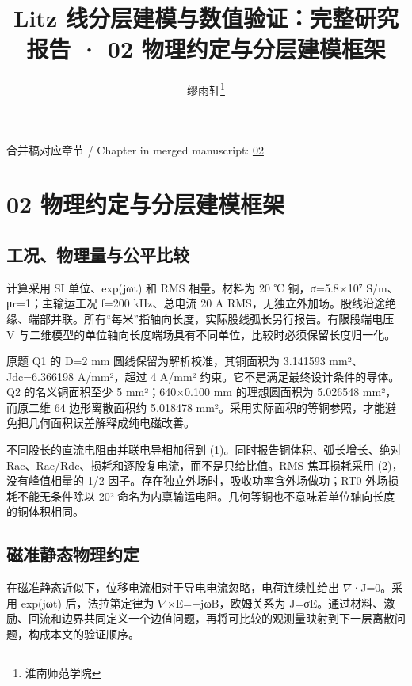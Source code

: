 \documentclass[journal,10pt]{IEEEtran}
\begin{document}
\title{Litz 线分层建模与数值验证：完整研究报告 · 02 物理约定与分层建模框架}
\author{缪雨轩\thanks{淮南师范学院}}

\maketitle
\noindent 合并稿对应章节 / Chapter in merged manuscript: \href{report_zh-CN_ieee.pdf#chapter-02}{02}\par
\FloatBarrier
\section*{02 物理约定与分层建模框架}
\hypertarget{chapter-02}{}
\subsection*{工况、物理量与公平比较}
\hypertarget{02.conventions.heading}{}
计算采用 SI 单位、exp(jωt) 和 RMS 相量。材料为 20 ℃ 铜，σ=5.8×10⁷ S/m、μr=1；主输运工况 f=200 kHz、总电流 20 A RMS，无独立外加场。股线沿途绝缘、端部并联。所有“每米”指轴向长度，实际股线弧长另行报告。有限段端电压 V 与二维模型的单位轴向长度端场具有不同单位，比较时必须保留长度归一化。


原题 Q1 的 D=2 mm 圆线保留为解析校准，其铜面积为 3.141593 mm²、Jdc=6.366198 A/mm²，超过 4 A/mm² 约束。它不是满足最终设计条件的导体。Q2 的名义铜面积至少 5 mm²；640×0.100 mm 的理想圆面积为 5.026548 mm²，而原二维 64 边形离散面积约 5.018478 mm²。采用实际面积的等铜参照，才能避免把几何面积误差解释成纯电磁改善。


不同股长的直流电阻由并联电导相加得到 \href{report_zh-CN_ieee.pdf#E01}{(1)}。同时报告铜体积、弧长增长、绝对 Rac、Rac/Rdc、损耗和逐股复电流，而不是只给比值。RMS 焦耳损耗采用 \href{report_zh-CN_ieee.pdf#E02}{(2)}，没有峰值相量的 1/2 因子。存在独立外场时，吸收功率含外场做功；RT0 外场损耗不能无条件除以 20² 命名为内禀输运电阻。几何等铜也不意味着单位轴向长度的铜体积相同。


\subsection*{磁准静态物理约定}
\hypertarget{02.maxwell.heading}{}
在磁准静态近似下，位移电流相对于导电电流忽略，电荷连续性给出 \(\nabla\)·J=0。采用 exp(jωt) 后，法拉第定律为 \(\nabla\)×E=−jωB，欧姆关系为 J=σE。通过材料、激励、回流和边界共同定义一个边值问题，再将可比较的观测量映射到下一层离散问题，构成本文的验证顺序。
\end{document}
